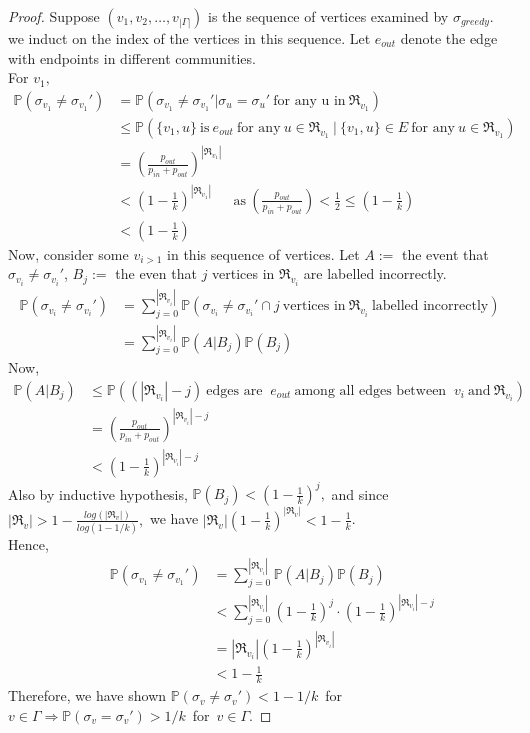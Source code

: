 \begin{proof}
    Suppose $(v_1, v_2, \ldots, v_{|\Gamma|})$ is the sequence of vertices examined by $\sigma_{greedy}$. we induct on the index of the vertices in this sequence. Let $e_{out}$ denote the edge with endpoints in different communities.\\
    For $v_1,$ \begin{align*}
    \mathbb{P}(\sigma_{v_1}\neq\sigma_{v_1}')&=\mathbb{P}(\sigma_{v_1}\neq\sigma_{v_1}'|\sigma_u=\sigma_u'~\text{for any u in}~\Re_{v_1})\\
    &\leq\mathbb{P}(\{v_1, u\}~\text{is}~e_{out}~\text{for any}~u\in\Re_{v_1}~|~\{v_1, u\}\in E~\text{for any}~u\in\Re_{v_1})\\
    &=(\frac{p_{out}}{p_{in}+p_{out}})^{|\Re_{v_1}|}\\
    &<(1-\frac{1}{k})^{|\Re_{v_1}|} ~~~~~~~\text{as}~(\frac{p_{out}}{p_{in}+p_{out}})<\frac{1}{2}\leq(1-\frac{1}{k})\\
    &<(1-\frac{1}{k})
    \end{align*}
    Now, consider some $v_{i>1}$ in this sequence of vertices. Let $A:=$ the event that $\sigma_{v_i}\neq\sigma_{v_i}'$, $B_j:=$ the even that $j$ vertices in $\Re_{v_i}$ are labelled incorrectly. \begin{align*}
    \mathbb{P}(\sigma_{v_i}\neq\sigma_{v_i}')&=\sum_{j=0}^{|\Re_{v_i}|}\mathbb{P}(\sigma_{v_i}\neq\sigma_{v_i}'\cap j~\text{vertices in}~\Re_{v_i}~\text{labelled incorrectly})\\
    &=\sum_{j=0}^{|\Re_{v_i}|}\mathbb{P}(A|B_j)\mathbb{P}(B_j)
    \end{align*}
Now, \begin{align*}
    \mathbb{P}(A|B_j)&\leq\mathbb{P}((|\Re_{v_i}|-j)~\text{edges are }~e_{out}~\text{among all edges between }~v_i~\text{and}~\Re_{v_i})\\
    &=(\frac{p_{out}}{p_{in}+p_{out}})^{|\Re_{v_i}|-j}\\
    &<(1-\frac{1}{k})^{|\Re_{v_i}|-j}
\end{align*} 
Also by inductive hypothesis, $\mathbb{P}(B_j)<(1-\frac{1}{k})^j,$ and since $|\Re_v|>1-\frac{log(|\Re_v|)}{log(1-1/k)},$ we have $|\Re_v|(1-\frac{1}{k})^{|\Re_v|}<1-\frac{1}{k}$.\\Hence,
\begin{align*}
    ~~~~~~~~\mathbb{P}(\sigma_{v_1}\neq\sigma_{v_1}')&=\sum_{j=0}^{|\Re_{v_i}|}\mathbb{P}(A|B_j)\mathbb{P}(B_j)\\
    &<\sum_{j=0}^{|\Re_{v_i}|}(1-\frac{1}{k})^j\cdot(1-\frac{1}{k})^{|\Re_{v_i}|-j}\\
    &=|\Re_{v_i}|(1-\frac{1}{k})^{|\Re_{v_i}|}\\
    &<1-\frac{1}{k}
\end{align*}
Therefore, we have shown $\mathbb{P}(\sigma_{v}\neq\sigma_{v}')<1-1/k$~for~$v\in\Gamma \Rightarrow\mathbb{P}(\sigma_{v}=\sigma_{v}')>1/k$~for~$v\in\Gamma.$
\end{proof}
